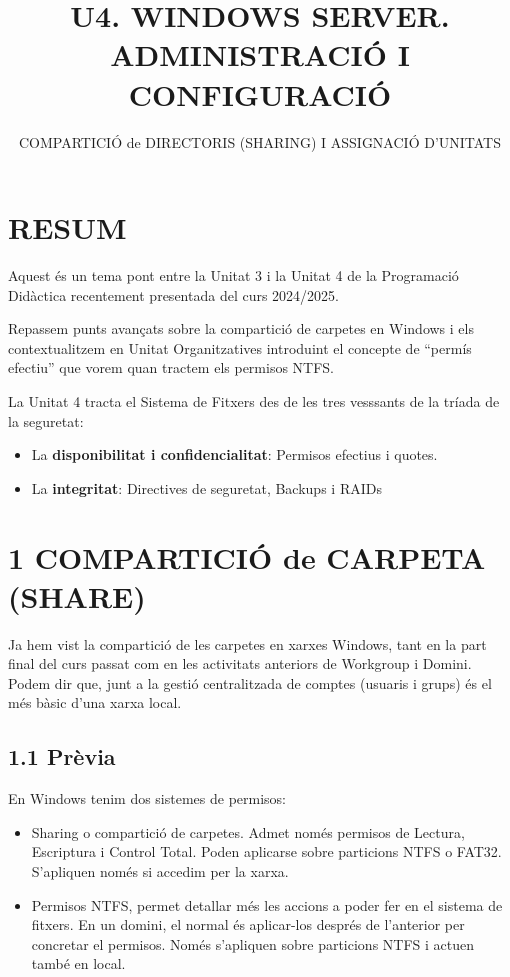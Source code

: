 \documentclass[
  a4paper,
]{article}
\title{U4. WINDOWS SERVER. ADMINISTRACIÓ I CONFIGURACIÓ}
\subtitle{COMPARTICIÓ de DIRECTORIS (SHARING) I ASSIGNACIÓ D'UNITATS}
\author{}
\date{\vspace{-2.5em}}
\begin{document}
\maketitle

{
\setcounter{tocdepth}{2}
\tableofcontents
}
\renewcommand\tablename{Tabla}
\newpage

\section{RESUM}\label{resum}

Aquest és un tema pont entre la Unitat 3 i la Unitat 4 de la Programació
Didàctica recentement presentada del curs 2024/2025.

Repassem punts avançats sobre la compartició de carpetes en Windows i
els contextualitzem en Unitat Organitzatives introduint el concepte de
``permís efectiu'' que vorem quan tractem els permisos NTFS.

La Unitat 4 tracta el Sistema de Fitxers des de les tres vesssants de la
tríada de la seguretat:

\begin{itemize}
\item
  La \textbf{disponibilitat i confidencialitat}: Permisos efectius i
  quotes.
\item
  La \textbf{integritat}: Directives de seguretat, Backups i RAIDs
\end{itemize}

\section{1 COMPARTICIÓ de CARPETA
(SHARE)}\label{comparticiuxf3-de-carpeta-share}

Ja hem vist la compartició de les carpetes en xarxes Windows, tant en la
part final del curs passat com en les activitats anteriors de Workgroup
i Domini. Podem dir que, junt a la gestió centralitzada de comptes
(usuaris i grups) és el més bàsic d'una xarxa local.

\subsection{1.1 Prèvia}\label{pruxe8via}

En Windows tenim dos sistemes de permisos:

\begin{itemize}
\item
  Sharing o compartició de carpetes. Admet només permisos de Lectura,
  Escriptura i Control Total. Poden aplicarse sobre particions NTFS o
  FAT32. S'apliquen només si accedim per la xarxa.
\item
  Permisos NTFS, permet detallar més les accions a poder fer en el
  sistema de fitxers. En un domini, el normal és aplicar-los després de
  l'anterior per concretar el permisos. Només s'apliquen sobre
  particions NTFS i actuen també en local.
\end{itemize}
\end{document}
